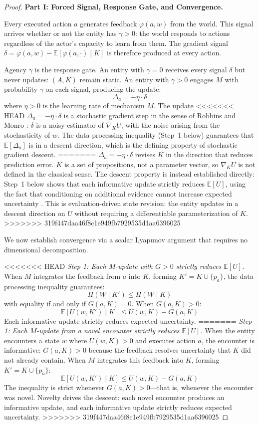 \documentclass[11pt]{article}
\theoremstyle{definition}
\begin{document}
\begin{proof}
\textbf{Part I: Forced Signal, Response Gate, and Convergence.}

Every executed action $a$ generates feedback $\varphi(a, w)$ from the
world. This signal arrives whether or not the entity has $\gamma > 0$: the
world responds to actions regardless of the actor's capacity to learn
from them. The gradient signal $\delta = \varphi(a, w) -
\mathbb{E}[\varphi(a, \cdot) \mid K]$ is therefore produced at every
action.

Agency $\gamma$ is the response gate. An entity with $\gamma = 0$ receives
every signal $\delta$ but never updates: $(A, K)$ remain static. An
entity with $\gamma > 0$ engages $M$ with probability $\gamma$ on each signal,
producing the update:
\[
\Delta_a = -\eta \cdot \delta
\]
where $\eta > 0$ is the learning rate of mechanism $M$. The update
<<<<<<< HEAD
$\Delta_a = -\eta \cdot \delta$ is a stochastic gradient step in the
sense of Robbins and Monro \cite{RobbinsMonro1951}: $\delta$ is a
noisy estimator of $\nabla_K U$, with the noise arising from the
stochasticity of $w$. The data processing inequality (Step~1 below)
guarantees that $\mathbb{E}[\Delta_a]$ is in a descent direction,
which is the defining property of stochastic gradient descent.
=======
$\Delta_a = -\eta \cdot \delta$ revises $K$ in the direction that
reduces prediction error. $K$ is a set of propositions, not a
parameter vector, so $\nabla_K U$ is not defined in the classical
sense. The descent property is instead established directly: Step~1
below shows that each informative update strictly reduces
$\mathbb{E}[U]$, using the fact that conditioning on additional
evidence cannot increase expected uncertainty \cite{Cover2006}. This
is evaluation-driven state revision: the entity updates in a descent
direction on $U$ without requiring a differentiable parameterization
of $K$.
>>>>>>> 319f447daa46f8c1e949fb7929535d1aa6396025

We now establish convergence via a scalar Lyapunov argument that
requires no dimensional decomposition.

<<<<<<< HEAD
\emph{Step 1: Each $M$-update with $G > 0$ strictly reduces
$\mathbb{E}[U]$.} When $M$ integrates the feedback from $a$ into $K$,
forming $K' = K \cup \{p_a\}$, the data processing inequality
\cite{Cover2006} guarantees:
\[
H(W \mid K') \leq H(W \mid K)
\]
with equality if and only if $G(a, K) = 0$. When $G(a, K) > 0$:
\[
\mathbb{E}[U(w, K') \mid K] \leq U(w, K) - G(a, K)
\]
Each informative update strictly reduces expected uncertainty.
=======
\emph{Step 1: Each $M$-update from a novel encounter strictly reduces
$\mathbb{E}[U]$.} When the entity encounters a state $w$ where
$U(w, K) > 0$ and executes action $a$, the encounter is informative:
$G(a, K) > 0$ because the feedback resolves uncertainty that $K$ did
not already contain. When $M$ integrates this feedback into $K$,
forming $K' = K \cup \{p_a\}$:
\[
\mathbb{E}[U(w, K') \mid K] \leq U(w, K) - G(a, K)
\]
The inequality is strict whenever $G(a, K) > 0$---that is, whenever
the encounter was novel. Novelty drives the descent: each novel
encounter produces an informative update, and each informative update
strictly reduces expected uncertainty.
>>>>>>> 319f447daa46f8c1e949fb7929535d1aa6396025


\end{proof}
\end{document}
